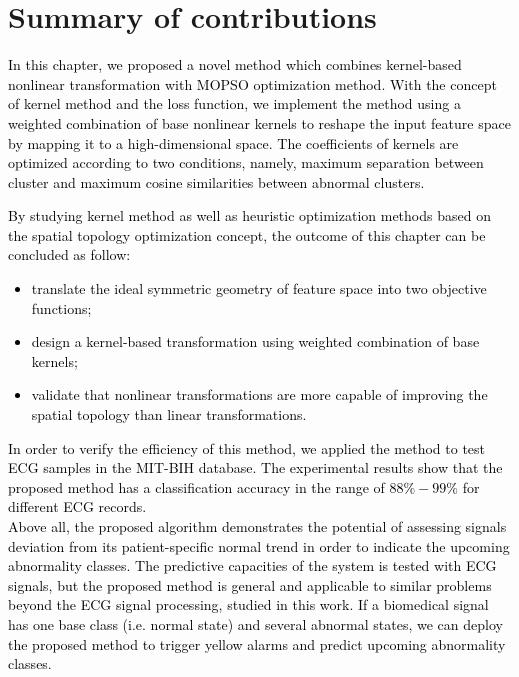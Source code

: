 \section{Summary of contributions} 

\textcolor{black}{In this chapter, we proposed a novel method which combines kernel-based nonlinear transformation with MOPSO optimization method. With the concept of kernel method and the loss function, we implement the method using a weighted combination of base nonlinear kernels to reshape the input feature space by mapping it to a high-dimensional space. The coefficients of kernels are optimized according to two conditions, namely, maximum separation between cluster and maximum cosine similarities between abnormal clusters.} \\
\textcolor{black}{By studying kernel method as well as heuristic optimization methods based on the spatial topology optimization concept, the outcome of this chapter can be concluded as follow:\\
\begin{itemize}
	\item translate the ideal symmetric geometry of feature space into two objective functions;
	\item design a kernel-based transformation using weighted combination of base kernels;
	\item validate that nonlinear transformations are more capable of improving the spatial topology than linear transformations.
\end{itemize}}

\textcolor{black}{%
In order to verify the efficiency of this method, we applied the method to test ECG samples in the MIT-BIH database\cite{mitdb}. The experimental results show that the proposed method has a classification accuracy in the range of $88\%-99\%$ for different ECG records.\\
Above all, the proposed algorithm demonstrates the potential of assessing signals deviation from its patient-specific normal trend in order to indicate the upcoming abnormality classes. The predictive capacities of the system is tested with ECG signals, but the proposed method is general and applicable to similar problems beyond the ECG signal processing, studied in this work. If a biomedical signal has one base class (i.e. normal state) and several abnormal states, we can deploy the proposed method to trigger yellow alarms and predict upcoming abnormality classes.}
  

